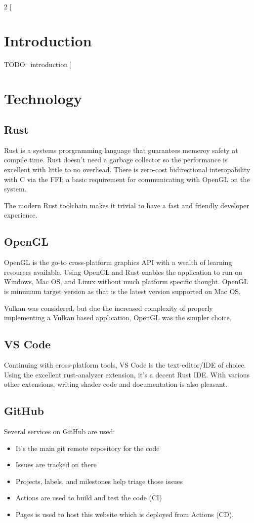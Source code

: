 \setlength{\columnsep}{0.5cm}
\begin{multicols}{2}
  [
    \section{Introduction}
    TODO:\ introduction
  ]

  \section{Technology}

  \subsection{Rust}
  Rust is a systems prorgramming language that guarantees memeroy safety at compile time.
  Rust doesn't need a garbage collector so the performance is excellent with little to no overhead.
  There is zero-cost bidirectional interopability with C via the FFI\@;
  a basic requirement for communicating with OpenGL on the system.

  The modern Rust toolchain makes it trivial to have a fast and friendly developer experience.

  \subsection{OpenGL}
  OpenGL is the go-to cross-platform graphics API with a wealth of learning resources available.
  Using OpenGL and Rust enables the application to run on Windows, Mac OS, and Linux without much platform specific thought. OpenGL  is minumum target version as that is the latest version supported on Mac OS\@.

  Vulkan was considered, but due the increased complexity of properly implementing a Vulkan based application, OpenGL was the simpler choice.

  \subsection{VS Code}
  Continuing with cross-platform tools, VS Code is the text-editor/IDE of choice.
  Using the excellent rust-analyzer extension, it's a decent Rust IDE\@.
  With various other extensions, writing shader code and documentation is also pleasant.

  \subsection{GitHub}
  Several services on GitHub are used:
  \begin{itemize}
    \item It's the main git remote repository for the code
    \item Issues are tracked on there
    \item Projects, labels, and milestones help triage those issues
    \item Actions are used to build and test the code (CI)
    \item Pages is used to host this website which is deployed from Actions (CD).
  \end{itemize}


\end{multicols}
